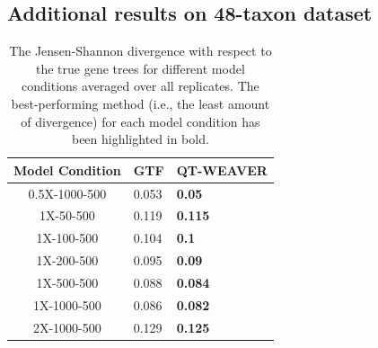 \documentclass[10pt,a4paper]{article}
\begin{document}

\clearpage

\subsection{Additional results on 48-taxon dataset}
\label{app:48-taxon}
\begin{table}[h!]
    \centering
    \caption{The Jensen-Shannon divergence with respect to the true gene trees for different model conditions averaged over all replicates. The best-performing method (i.e., the least amount of divergence) for each model condition has been highlighted in bold.}
    \label{tab:48-divergence}

    \begin{tabular}{|c|C{3cm}|C{3cm}|}
        \hline
        \textbf{Model Condition} & \textbf{GTF} & \textbf{QT-WEAVER} \\
        \hline
        0.5X-1000-500 & 0.053 & \textbf{0.05} \\
        \hline
        1X-50-500 & 0.119 & \textbf{0.115} \\
        \hline
        1X-100-500 & 0.104 & \textbf{0.1} \\
        \hline
        1X-200-500 & 0.095 & \textbf{0.09} \\
        \hline
        1X-500-500 & 0.088 & \textbf{0.084} \\
        \hline
        1X-1000-500 & 0.086 & \textbf{0.082} \\
        \hline
        2X-1000-500 & 0.129 & \textbf{0.125} \\
        \hline
    \end{tabular}
\end{table}
\end{document}
